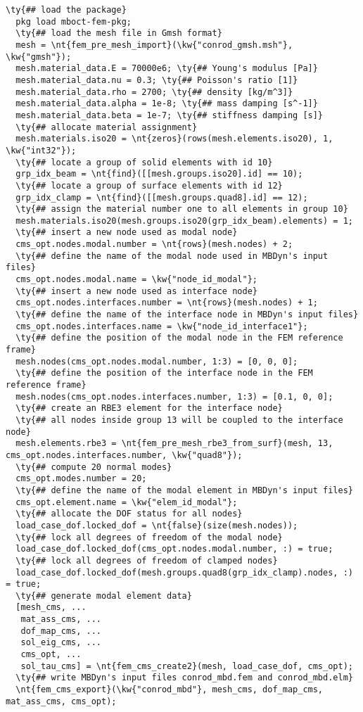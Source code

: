 \begin{Verbatim}[commandchars=\\\{\}]
  \ty{## load the package}
  pkg load mboct-fem-pkg; 
  \ty{## load the mesh file in Gmsh format}
  mesh = \nt{fem_pre_mesh_import}(\kw{"conrod_gmsh.msh"}, \kw{"gmsh"}); 
  mesh.material_data.E = 70000e6; \ty{## Young's modulus [Pa]}
  mesh.material_data.nu = 0.3; \ty{## Poisson's ratio [1]}
  mesh.material_data.rho = 2700; \ty{## density [kg/m^3]}
  mesh.material_data.alpha = 1e-8; \ty{## mass damping [s^-1]}
  mesh.material_data.beta = 1e-7; \ty{## stiffness damping [s]}
  \ty{## allocate material assignment}
  mesh.materials.iso20 = \nt{zeros}(rows(mesh.elements.iso20), 1, \kw{"int32"});
  \ty{## locate a group of solid elements with id 10}
  grp_idx_beam = \nt{find}([[mesh.groups.iso20].id] == 10);
  \ty{## locate a group of surface elements with id 12}
  grp_idx_clamp = \nt{find}([[mesh.groups.quad8].id] == 12);
  \ty{## assign the material number one to all elements in group 10}
  mesh.materials.iso20(mesh.groups.iso20(grp_idx_beam).elements) = 1;
  \ty{## insert a new node used as modal node}
  cms_opt.nodes.modal.number = \nt{rows}(mesh.nodes) + 2;
  \ty{## define the name of the modal node used in MBDyn's input files}
  cms_opt.nodes.modal.name = \kw{"node_id_modal"};
  \ty{## insert a new node used as interface node}
  cms_opt.nodes.interfaces.number = \nt{rows}(mesh.nodes) + 1;
  \ty{## define the name of the interface node in MBDyn's input files}
  cms_opt.nodes.interfaces.name = \kw{"node_id_interface1"};
  \ty{## define the position of the modal node in the FEM reference frame}
  mesh.nodes(cms_opt.nodes.modal.number, 1:3) = [0, 0, 0];
  \ty{## define the position of the interface node in the FEM reference frame}
  mesh.nodes(cms_opt.nodes.interfaces.number, 1:3) = [0.1, 0, 0];
  \ty{## create an RBE3 element for the interface node}
  \ty{## all nodes inside group 13 will be coupled to the interface node}
  mesh.elements.rbe3 = \nt{fem_pre_mesh_rbe3_from_surf}(mesh, 13, cms_opt.nodes.interfaces.number, \kw{"quad8"});
  \ty{## compute 20 normal modes}
  cms_opt.modes.number = 20;
  \ty{## define the name of the modal element in MBDyn's input files}
  cms_opt.element.name = \kw{"elem_id_modal"};
  \ty{## allocate the DOF status for all nodes}
  load_case_dof.locked_dof = \nt{false}(size(mesh.nodes));
  \ty{## lock all degrees of freedom of the modal node}
  load_case_dof.locked_dof(cms_opt.nodes.modal.number, :) = true;
  \ty{## lock all degrees of freedom of clamped nodes}
  load_case_dof.locked_dof(mesh.groups.quad8(grp_idx_clamp).nodes, :) = true;
  \ty{## generate modal element data}
  [mesh_cms, ...
   mat_ass_cms, ...
   dof_map_cms, ...
   sol_eig_cms, ...
   cms_opt, ...
   sol_tau_cms] = \nt{fem_cms_create2}(mesh, load_case_dof, cms_opt);
  \ty{## write MBDyn's input files conrod_mbd.fem and conrod_mbd.elm}
  \nt{fem_cms_export}(\kw{"conrod_mbd"}, mesh_cms, dof_map_cms, mat_ass_cms, cms_opt); 
\end{Verbatim}

